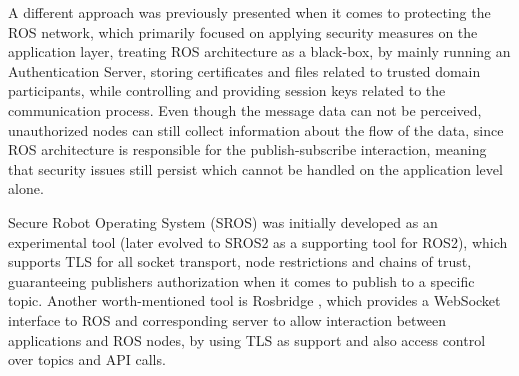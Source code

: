 A different approach was previously presented \cite{application-security-ros} when it comes to protecting the ROS network, which primarily focused on applying security measures on the application layer, treating ROS architecture as a black-box, by mainly running an Authentication Server, storing certificates and files related to trusted domain participants, while controlling and providing session keys related to the communication process. Even though the message data can not be perceived, unauthorized nodes can still collect information about the flow of the data, since ROS architecture is responsible for the publish-subscribe interaction, meaning that security issues still persist which cannot be handled on the application level alone.  

Secure Robot Operating System (SROS) \cite{white2016sros} was initially developed as an experimental tool (later evolved to SROS2 as a supporting tool for ROS2), which supports TLS for all socket transport, node restrictions and chains of trust, guaranteeing publishers authorization when it comes to publish to a specific topic. Another worth-mentioned tool is Rosbridge \cite{crick2017rosbridge}, which provides a WebSocket interface to ROS and corresponding server to allow interaction between applications and ROS nodes, by using TLS as support and also access control over topics and API calls. 